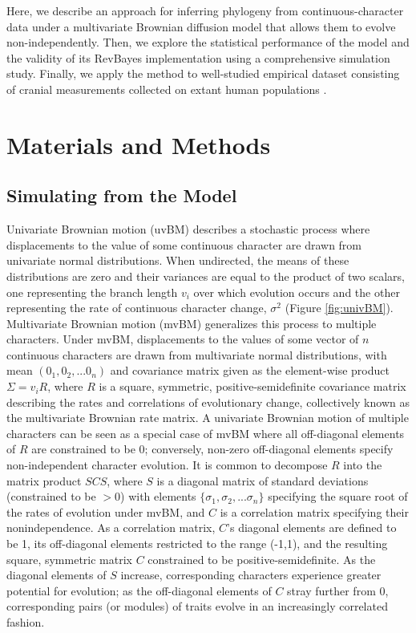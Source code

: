 Here, we describe an approach for inferring phylogeny from continuous-character data under a multivariate Brownian diffusion model that allows them to evolve non-independently. Then, we explore the statistical performance of the model and the validity of its RevBayes \citep{hohnaRevBayesBayesianPhylogenetic2016a} implementation using a comprehensive simulation study. Finally, we apply the method to well-studied empirical dataset consisting of cranial measurements collected on extant human populations \citep{howellsCranialVariationMan1973, howellsSkullShapesMap1989, howellsWhoWhoSkulls1995}. 

\clearpage

\section{Materials and Methods}

\subsection{Simulating from the Model}

Univariate Brownian motion (uvBM) describes a stochastic process where displacements to the value of some continuous character are drawn from univariate normal distributions. When undirected, the means of these distributions are zero and their variances are equal to the product of two scalars, one representing the branch length $v_i$ over which evolution occurs and the other representing the rate of continuous character change, $\sigma^2$ (Figure \ref{fig:univBM}). Multivariate Brownian motion (mvBM) generalizes this process to multiple characters. Under mvBM, displacements to the values of some vector of $n$ continuous characters are drawn from multivariate normal distributions, with mean $(0_1,0_2,...0_n)$ and covariance matrix given as the element-wise product $\Sigma = v_iR$, where $R$ is a square, symmetric, positive-semidefinite covariance matrix describing the rates and correlations of evolutionary change, collectively known as the multivariate Brownian rate matrix. A univariate Brownian motion of multiple characters can be seen as a special case of mvBM where all off-diagonal elements of $R$ are constrained to be 0; conversely, non-zero off-diagonal elements specify non-independent character evolution. It is common to decompose $R$ into the matrix product $SCS$, where $S$ is a diagonal matrix of standard deviations (constrained to be $>0$) with elements $\{\sigma_1, \sigma_2, ... \sigma_n\}$ specifying the square root of the rates of evolution under mvBM, and $C$ is a correlation matrix specifying their nonindependence. As a correlation matrix, $C$'s diagonal elements are defined to be 1, its off-diagonal elements restricted to the range (-1,1), and the resulting square, symmetric matrix $C$ constrained to be positive-semidefinite. As the diagonal elements of $S$ increase, corresponding characters experience greater potential for evolution; as the off-diagonal elements of $C$ stray further from 0, corresponding pairs (or modules) of traits evolve in an increasingly correlated fashion.


